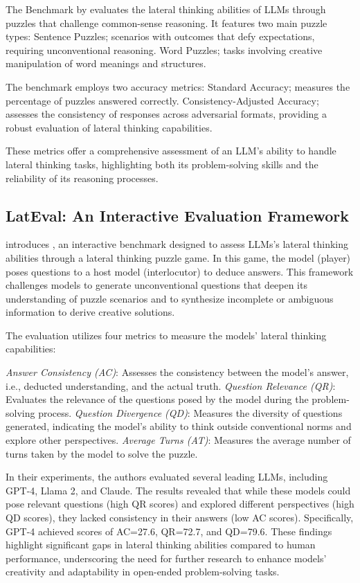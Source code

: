 The  Benchmark by \textcite{jiangBRAINTEASERLateralThinking2023} evaluates the lateral thinking abilities of \acp{LLM} through puzzles that challenge common-sense reasoning. It features two main puzzle types: Sentence Puzzles; scenarios with outcomes that defy expectations, requiring unconventional reasoning. Word Puzzles; tasks involving creative manipulation of word meanings and structures.

The benchmark employs two accuracy metrics: Standard Accuracy; measures the percentage of puzzles answered correctly. Consistency-Adjusted Accuracy; assesses the consistency of responses across adversarial formats, providing a robust evaluation of lateral thinking capabilities.

These metrics offer a comprehensive assessment of an \ac{LLM}'s ability to handle lateral thinking tasks, highlighting both its problem-solving skills and the reliability of its reasoning processes.

\subsection{LatEval: An Interactive Evaluation Framework}

\textcite{huangLatEvalInteractiveLLMs2024} introduces , an interactive benchmark designed to assess \acp{LLM}'s lateral thinking abilities through a lateral thinking puzzle game. In this game, the model (player) poses questions to a host model (interlocutor) to deduce answers. This framework challenges models to generate unconventional questions that deepen its understanding of puzzle scenarios and to synthesize incomplete or ambiguous information to derive creative solutions.

The evaluation utilizes four metrics to measure the models' lateral thinking capabilities:

\textit{Answer Consistency (AC)}: Assesses the consistency between the model's answer, i.e., deducted understanding, and the actual truth.
\textit{Question Relevance (QR)}: Evaluates the relevance of the questions posed by the model during the problem-solving process.
\textit{Question Divergence (QD)}: Measures the diversity of questions generated, indicating the model's ability to think outside conventional norms and explore other perspectives.
\textit{Average Turns (AT)}: Measures the average number of turns taken by the model to solve the puzzle.

In their experiments, the authors evaluated several leading \acp{LLM}, including GPT-4, Llama 2, and Claude. The results revealed that while these models could pose relevant questions (high QR scores) and explored different perspectives (high QD scores), they lacked consistency in their answers (low AC scores). Specifically, GPT-4 achieved scores of AC=27.6, QR=72.7, and QD=79.6. These findings highlight significant gaps in lateral thinking abilities compared to human performance, underscoring the need for further research to enhance models' creativity and adaptability in open-ended problem-solving tasks.

